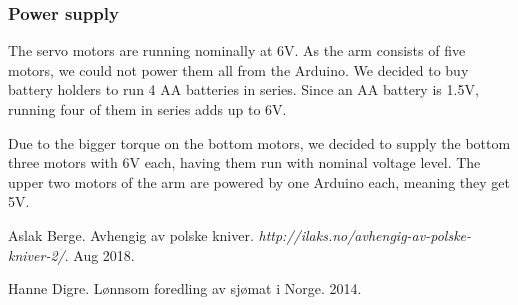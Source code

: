 \documentclass[11pt,a4paper, titlepage]{article}
\begin{document}
	\subsubsection{Power supply}
	The servo motors are running nominally at 6V. As the arm consists of five motors, we could not power them all from the Arduino. We decided to buy battery holders to run 4 AA batteries in series. Since an AA battery is 1.5V, running four of them in series adds up to 6V.
	
	Due to the bigger torque on the bottom motors, we decided to supply the bottom three motors with 6V each,  having them run with nominal voltage level. The upper two motors of the arm are powered by one Arduino each, meaning they get 5V.
	
	
	
	
	

\begin{thebibliography}{1}

 Aslak Berge. Avhengig av polske kniver. \textit{http://ilaks.no/avhengig-av-polske-kniver-2/}. Aug 2018.

 Hanne Digre. Lønnsom foredling av sjømat i Norge. 2014.

\end{thebibliography}	
	
\end{document}
